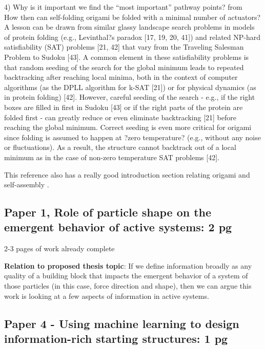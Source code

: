 \documentclass[12pt, oneside]{article}   	%
\begin{document}
4) Why is it important we find the ``most important'' pathway points? from \cite{Stern_2017_arxiv} \\
How then can self-folding origami be folded with a
minimal number of actuators? A lesson can be drawn
from similar glassy landscape search problems in models
of protein folding (e.g., Levinthal?s paradox [17, 19, 20,
41]) and related NP-hard satisfiability (SAT) problems
[21, 42] that vary from the Traveling Salesman Problem
to Sudoku [43]. A common element in these satisfiability
problems is that random seeding of the search for
the global minimum leads to repeated backtracking after
reaching local minima, both in the context of computer
algorithms (as the DPLL algorithm for k-SAT [21]) or for
physical dynamics (as in protein folding) [42]. However,
careful seeding of the search - e.g., if the right boxes are
filled in first in Sudoku [43] or if the right parts of the protein
are folded first - can greatly reduce or even eliminate
backtracking [21] before reaching the global minimum.
Correct seeding is even more critical for origami since
folding is assumed to happen at ?zero temperature? (e.g.,
without any noise or fluctuations). As a result, the structure
cannot backtrack out of a local minimum as in the
case of non-zero temperature SAT problems [42].

This reference also has a really good introduction section relating origami and self-assembly \cite{Stern_2017_arxiv}.


\subsection{Paper 1, Role of particle shape on the emergent behavior of active systems: 2 pg}
2-3 pages of work already complete

\textbf{Relation to proposed thesis topic}: If we define information broadly as any quality of a building block that impacts the emergent behavior of a system of those particles (in this case, force direction and shape), then we can argue this work is looking at a few aspects of information in active systems.







\subsection{Paper 4 - Using machine learning to design information-rich starting structures: 1 pg}
\end{document}
